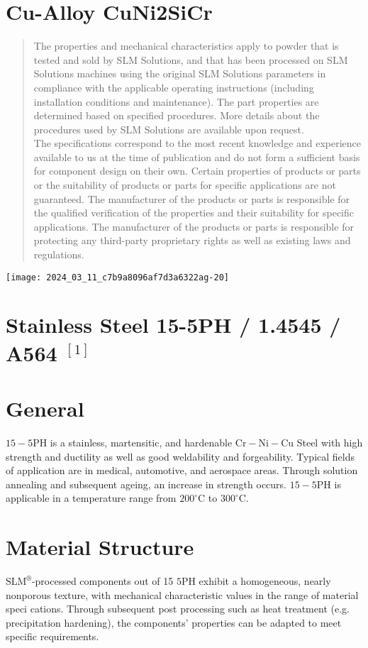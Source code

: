 \documentclass[10pt]{article}
\begin{document}
\section*{Cu-Alloy CuNi2SiCr }
\begin{abstract}
The properties and mechanical characteristics apply to powder that is tested and sold by SLM Solutions, and that has been processed on SLM Solutions machines using the original SLM Solutions parameters in compliance with the applicable operating instructions (including installation conditions and maintenance). The part properties are determined based on specified procedures. More details about the procedures used by SLM Solutions are available upon request.\\
The specifications correspond to the most recent knowledge and experience available to us at the time of publication and do not form a sufficient basis for component design on their own. Certain properties of products or parts or the suitability of products or parts for specific applications are not guaranteed. The manufacturer of the products or parts is responsible for the qualified verification of the properties and their suitability for specific applications. The manufacturer of the products or parts is responsible for protecting any third-party proprietary rights as well as existing laws and regulations.
\end{abstract}

\begin{center}
\texttt{[image: 2024\_03\_11\_c7b9a8096af7d3a6322ag-20]}
\end{center}

\section*{Stainless Steel 15-5PH / 1.4545 / A564 ${ }^{[1]}$}
\section*{General}
$15-5 \mathrm{PH}$ is a stainless, martensitic, and hardenable $\mathrm{Cr}-\mathrm{Ni}-\mathrm{Cu}$ Steel with high strength and ductility as well as good weldability and forgeability. Typical fields of application are in medical, automotive, and aerospace areas. Through solution annealing and subsequent ageing, an increase in strength occurs. $15-5 \mathrm{PH}$ is applicable in a temperature range from $200^{\circ} \mathrm{C}$ to $300^{\circ} \mathrm{C}$.

\section*{Material Structure}
$\mathrm{SLM}^{\circledR}$-processed components out of 15 $5 \mathrm{PH}$ exhibit a homogeneous, nearly nonporous texture, with mechanical characteristic values in the range of material speci cations. Through subsequent post processing such as heat treatment (e.g. precipitation hardening), the components' properties can be adapted to meet specific requirements.
\end{document}
